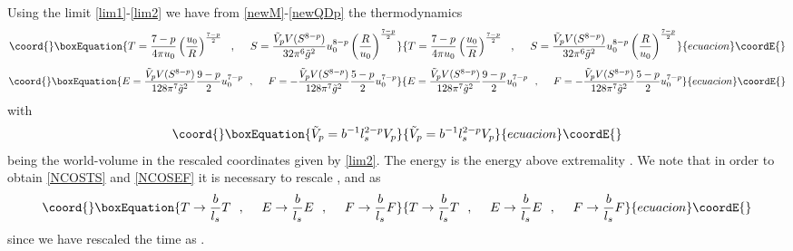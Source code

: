 \documentclass[a4paper,twoside,titlepage,12pt]{article}
\begin{document}
Using the limit \eqref{lim1}-\eqref{lim2}
we have from \eqref{newM}-\eqref{newQDp} the thermodynamics 
%
\begin{equation}\coord{}\boxEquation{
\label{NCOSTS}
T = \frac{7-p}{4\pi u_0} \left( \frac{u_0}{R} \right)^{\frac{7-p}{2}}
\spa
S = \frac{\tilde{V}_p V(S^{8-p}) }{32 \pi^6 \tilde{g}^2} u_0^{8-p} 
\left( \frac{R}{u_0} \right)^{\frac{7-p}{2}}
}{
T = \frac{7-p}{4\pi u_0} \left( \frac{u_0}{R} \right)^{\frac{7-p}{2}}
\spa
S = \frac{\tilde{V}_p V(S^{8-p}) }{32 \pi^6 \tilde{g}^2} u_0^{8-p} 
\left( \frac{R}{u_0} \right)^{\frac{7-p}{2}}
}{ecuacion}\coordE{}\end{equation}
%
\begin{equation}\coord{}\boxEquation{
\label{NCOSEF}
E = \frac{\tilde{V}_p V(S^{8-p}) }{128 \pi^7 \tilde{g}^2} 
\frac{9-p}{2} u_0^{7-p}
\spa
F = - \frac{\tilde{V}_p V(S^{8-p}) }{128 \pi^7 \tilde{g}^2} 
\frac{5-p}{2} u_0^{7-p}
}{
E = \frac{\tilde{V}_p V(S^{8-p}) }{128 \pi^7 \tilde{g}^2} 
\frac{9-p}{2} u_0^{7-p}
\spa
F = - \frac{\tilde{V}_p V(S^{8-p}) }{128 \pi^7 \tilde{g}^2} 
\frac{5-p}{2} u_0^{7-p}
}{ecuacion}\coordE{}\end{equation}
%
with 
%
\begin{equation}\coord{}\boxEquation{
\tilde{V}_p = b^{-1} l_s^{2-p} V_p
}{
\tilde{V}_p = b^{-1} l_s^{2-p} V_p
}{ecuacion}\coordE{}\end{equation}
%
being the world-volume in the rescaled coordinates given by \eqref{lim2}.
The energy \coordHE{} is the energy above extremality 
\coordHE{}.
We note that in order to obtain \eqref{NCOSTS} and \eqref{NCOSEF} 
it is necessary to rescale \coordHE{}, \coordHE{} and \coordHE{} as
%
\begin{equation}\coord{}\boxEquation{
T \rightarrow \frac{b}{l_s} T
\spa
E \rightarrow \frac{b}{l_s} E
\spa 
F \rightarrow \frac{b}{l_s} F
}{
T \rightarrow \frac{b}{l_s} T
\spa
E \rightarrow \frac{b}{l_s} E
\spa 
F \rightarrow \frac{b}{l_s} F
}{ecuacion}\coordE{}\end{equation}
%
since we have rescaled the time as \coordHE{}.
\end{document}
